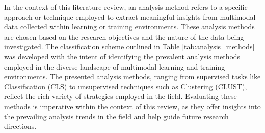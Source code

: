 \documentclass[manuscript,screen,review]{acmart}
\begin{document}
In the context of this literature review, an analysis method refers to a specific approach or technique employed to extract meaningful insights from multimodal data collected within learning or training environments. These analysis methods are chosen based on the research objectives and the nature of the data being investigated. The classification scheme outlined in Table \ref{tab:analysis_methods} was developed with the intent of identifying the prevalent analysis methods employed in the diverse landscape of multimodal learning and training environments. The presented analysis methods, ranging from supervised tasks like Classification (CLS) to unsupervised techniques such as Clustering (CLUST), reflect the rich variety of strategies employed in the field. Evaluating these methods is imperative within the context of this review, as they offer insights into the prevailing analysis trends in the field and help guide future research directions.
\end{document}
